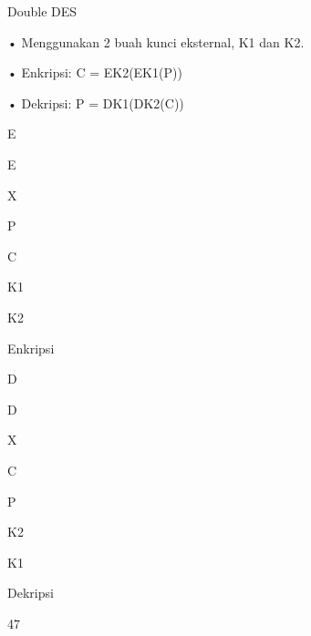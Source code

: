 \documentclass{article}
\begin{document}

Double DES

• Menggunakan 2 buah kunci eksternal, K1 dan K2.

• Enkripsi: C = EK2(EK1(P))

• Dekripsi: P = DK1(DK2(C))

E

E

X

P

C

K1

K2

Enkripsi

D

D

X

C

P

K2

K1

Dekripsi

47
\end{document}
